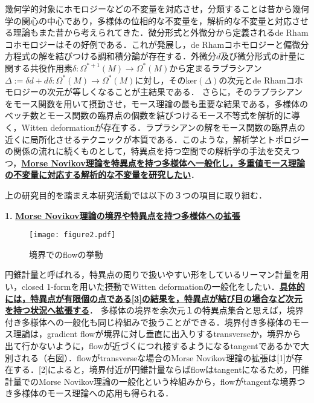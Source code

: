 \documentclass[11pt,a4j,dvipdfmx]{jarticle} 					%
\newcommand{\研究課題名}{象の卵}
\newcommand{\研究機関名}{京都大学}
\newcommand{\研究代表者氏名}{福士謙二}
\begin{document}
幾何学的対象にホモロジーなどの不変量を対応させ，分類することは昔から幾何学の関心の中心であり，多様体の位相的な不変量を，解析的な不変量と対応させる理論もまた昔から考えられてきた．微分形式と外微分から定義されるde Rhamコホモロジーはその好例である．これが発展し，de Rhamコホモロジーと偏微分方程式の解を結びつける調和積分論が存在する．外微分$d$及び微分形式の計量に関する共役作用素$\delta:\Omega^{*+1}(M)\rightarrow \Omega^{*}(M)$から定まるラプラシアン$\Delta:=\delta d + d\delta:\Omega^{*}(M)\rightarrow\Omega^{*}(M)$に対し，そのker$(\Delta)$の次元とde Rhamコホモロジーの次元が等しくなることが主結果である．
さらに，そのラプラシアンをモース関数を用いて摂動させ，モース理論の最も重要な結果である，多様体のベッチ数とモース関数の臨界点の個数を結びつけるモース不等式を解析的に導く，Witten deformationが存在する．ラプラシアンの解をモース関数の臨界点の近くに局所化させるテクニックが本質である．このような，解析学とトポロジーの関係の流れに続くものとして，特異点を持つ空間での解析学の手法を交えつつ，\textbf{\ul{Morse Novikov理論を特異点を持つ多様体へ一般化し，多重値モース理論の不変量に対応する解析的な不変量を研究したい}}．




\noindent
{}

上の研究目的を踏まえ本研究活動では以下の３つの項目に取り組む．


\begin{screen}
\textbf{1. }\textbf{\ul{Morse Novikov理論の境界や特異点を持つ多様体への拡張}}

\begin{wrapfigure}[8]{r}[0mm]{12zw}
    \vspace*{-\intextsep} %
	\texttt{[image: figure2.pdf]}
	\caption{境界でのflowの挙動}
\end{wrapfigure}

円錐計量と呼ばれる，特異点の周りで扱いやすい形をしているリーマン計量を用い，closed 1-formを用いた摂動でWitten deformationの一般化をしたい．\textbf{\ul{具体的には，特異点が有限個の点である[3]の結果を，特異点が結び目の場合など次元を持つ状況へ拡張する}}．
多様体の境界を余次元１の特異点集合と思えば，境界付き多様体への一般化も同じ枠組みで扱うことができる．境界付き多様体のモース理論は，gradient flowが境界に対し垂直に出入りするtransverseか，境界から出て行かないように，flowが近づくにつれ接するようになるtangentであるかで大別される（右図）．flowがtransverseな場合のMorse Novikov理論の拡張は[1]が存在する．[2]によると，境界付近が円錐計量ならばflowはtangentになるため，円錐計量でのMorse Novikov理論の一般化という枠組みから，flowがtangentな境界つき多様体のモース理論への応用も得られる．


\end{screen}
\end{document}
